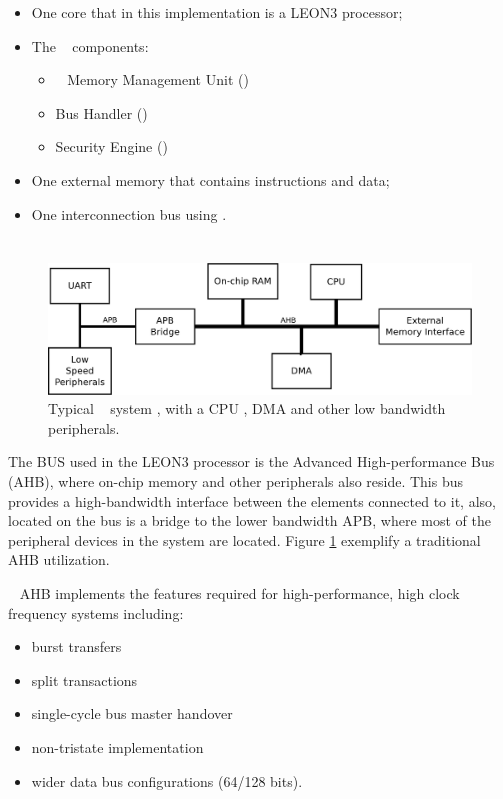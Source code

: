 \begin{itemize}
    \item One core that in this implementation is a LEON3 processor;
    \item The \cshia~ components:
    \begin{itemize}
        \item \ptag~ Memory Management Unit (\pmmu)
        \item Bus Handler (\handler)
        \item Security Engine (\seceng) 
    \end{itemize}
    \item One external memory that contains instructions and data;
    \item One interconnection bus using \amba.
\end{itemize} 


\section{\amba}
\label{sec:amba2}
\begin{figure}[!ht]
    \centering
    \includegraphics[width=1\textwidth]{figures/pdf/typical_amba_new.pdf}
    \caption{Typical \amba~ system , with a CPU , DMA and other low bandwidth peripherals. }
    \label{fig:general}
\end{figure}

The BUS used in the LEON3 processor is the Advanced High-performance Bus (AHB), where on-chip memory and other peripherals also reside. This bus provides a high-bandwidth interface between the elements connected to it, also, located on the bus is a bridge to the lower bandwidth APB, where most of the peripheral devices in the system are located. Figure \ref{fig:general} exemplify a traditional AHB utilization.

\amba~ AHB implements the features required for high-performance, high clock
frequency systems including:
\begin{itemize}
 \item {burst transfers}
\item {split transactions}
\item {single-cycle bus master handover}
\item {non-tristate implementation}
\item {wider data bus configurations (64/128 bits).}
\end{itemize}

